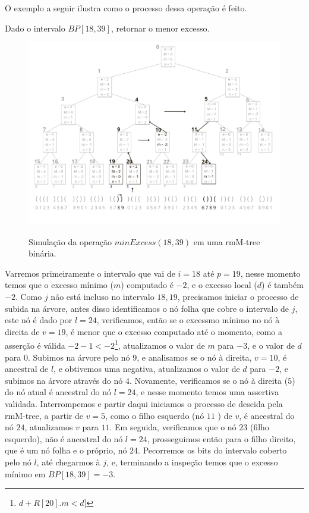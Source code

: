     O exemplo a seguir ilustra como o processo dessa operação é feito.
    \begin{example}
        Dado o intervalo $BP[18,39]$, retornar o menor excesso.

       \begin{figure}[!ht]
           \centering
             \caption[minExcess(18,39).]{Simulação da operação $minExcess(18,39)$ em uma rmM-tree binária.}
             \includegraphics[width=\columnwidth]{images/rmm-tree-bin-minexcess.png}
             \label{fig:bin-minexcess}
        \end{figure}
        Varremos primeiramente o intervalo que vai de $i=18$ até $p=19$, nesse momento temos que o excesso mínimo ($m$) computado é $-2$, e o excesso local ($d$)
        é também $-2$. Como $j$ não está incluso no intervalo $18,19$, precisamos iniciar o processo de subida na árvore, antes disso identificamos o nó folha que cobre
        o intervalo de $j$, este nó é dado por $l=24$, verificamos, então se o excessmo mínimo no nó à direita de $v=19$, é menor que o excesso computado até o momento,
        como a asserção é válida $-2 -1 < -2$\footnote{$d + R[20].m < d]$}, atualizamos o valor de $m$ para $-3$, e o valor de $d$ para $0$.
        Subimos na árvore pelo nó $9$, e analisamos se o nó à direita, $v=10$,  é ancestral de $l$, e obtivemos uma negativa,
        atualizamos o valor de $d$ para $-2$, e subimos na árvore através do nó $4$. Novamente, verificamos se o nó à direita ($5$) do nó atual é ancestral do nó $l=24$, e nesse momento
        temos uma assertiva validada. Interrompemos e partir daqui iniciamos o processo de descida pela rmM-tree, a partir de $v=5$,
        como o filho esquerdo (nó $11$ ) de $v$, é ancestral do nó $24$, atualizamos $v$ para $11$. Em seguida, verificamos que o nó $23$ (filho esquerdo), 
        não é ancestral do nó $l=24$,  prosseguimos então para o filho direito, que é um nó folha e o próprio, nó $24$.
        Pecorremos os bits do intervalo coberto pelo nó $l$, até chegarmos à $j$, e, terminando a inspeção temos que o excesso mínimo em $BP[18,39]=-3$.
    \end{example}

